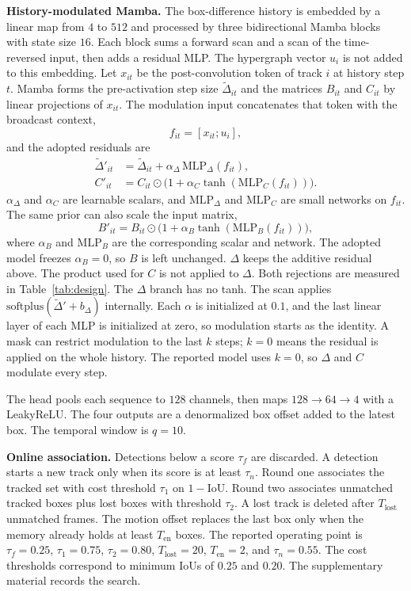 \documentclass[10pt,twocolumn,letterpaper]{article}
\begin{document}
\textbf{History-modulated Mamba.}
The box-difference history is embedded by a linear map from $4$ to $512$ and processed by three bidirectional Mamba blocks~\cite{gu2023mamba} with state size $16$. Each block sums a forward scan and a scan of the time-reversed input, then adds a residual MLP. The hypergraph vector $u_i$ is not added to this embedding. Let $x_{it}$ be the post-convolution token of track $i$ at history step $t$. Mamba forms the pre-activation step size $\widetilde\Delta_{it}$ and the matrices $B_{it}$ and $C_{it}$ by linear projections of $x_{it}$. The modulation input concatenates that token with the broadcast context,
\begin{equation}
f_{it}=[x_{it};u_i],
\end{equation}
and the adopted residuals are
\begin{align}
\widetilde\Delta'_{it}&=\widetilde\Delta_{it}+\alpha_{\Delta}\,\mathrm{MLP}_{\Delta}(f_{it}),\\
C'_{it}&=C_{it}\odot\big(1+\alpha_{C}\tanh(\mathrm{MLP}_{C}(f_{it}))\big).
\end{align}
$\alpha_{\Delta}$ and $\alpha_{C}$ are learnable scalars, and $\mathrm{MLP}_{\Delta}$ and $\mathrm{MLP}_{C}$ are small networks on $f_{it}$. The same prior can also scale the input matrix,
\begin{equation}
B'_{it}=B_{it}\odot\big(1+\alpha_{B}\tanh(\mathrm{MLP}_{B}(f_{it}))\big),
\end{equation}
where $\alpha_{B}$ and $\mathrm{MLP}_{B}$ are the corresponding scalar and network. The adopted model freezes $\alpha_B=0$, so $B$ is left unchanged. $\Delta$ keeps the additive residual above. The product used for $C$ is not applied to $\Delta$. Both rejections are measured in Table~\ref{tab:design}. The $\Delta$ branch has no tanh. The scan applies $\mathrm{softplus}(\widetilde\Delta'+b_{\Delta})$ internally. Each $\alpha$ is initialized at $0.1$, and the last linear layer of each MLP is initialized at zero, so modulation starts as the identity. A mask can restrict modulation to the last $k$ steps; $k=0$ means the residual is applied on the whole history. The reported model uses $k=0$, so $\Delta$ and $C$ modulate every step.

The head pools each sequence to $128$ channels, then maps $128\rightarrow64\rightarrow4$ with a LeakyReLU. The four outputs are a denormalized box offset added to the latest box. The temporal window is $q=10$.

\textbf{Online association.}
Detections below a score $\tau_f$ are discarded. A detection starts a new track only when its score is at least $\tau_n$. Round one associates the tracked set with cost threshold $\tau_1$ on $1-\mathrm{IoU}$. Round two associates unmatched tracked boxes plus lost boxes with threshold $\tau_2$. A lost track is deleted after $T_{\mathrm{lost}}$ unmatched frames. The motion offset replaces the last box only when the memory already holds at least $T_{\mathrm{en}}$ boxes. The reported operating point is $\tau_f=0.25$, $\tau_1=0.75$, $\tau_2=0.80$, $T_{\mathrm{lost}}=20$, $T_{\mathrm{en}}=2$, and $\tau_n=0.55$. The cost thresholds correspond to minimum IoUs of $0.25$ and $0.20$. The supplementary material records the search.
\end{document}
